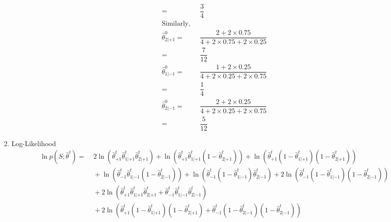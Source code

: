 \documentclass[english]{article}
\begin{document}
\begin{enumerate}
\begin{align*}
    = &\; \dfrac{3}{4}\\
    \text{Similarly, }\\
    \hat{\theta}_{2|+1}^0 = &\; \dfrac{2+2\times 0.75}{4+2\times 0.75 + 2\times 0.25}\\
    = &\; \dfrac{7}{12}\\
    \hat{\theta}_{1|-1}^0 = &\; \dfrac{1+2\times 0.25}{4+2\times 0.25 + 2 \times 0.75}\\
    = &\; \dfrac{1}{4}\\
    \hat{\theta}_{2|-1}^0 = &\; \dfrac{2+2\times 0.25}{4+2\times0.25+2\times0.75}\\
    = &\; \dfrac{5}{12}
    \end{align*}
    \item Log-Likelihood
    \begin{align*}
    \ln p(S; \hat{\theta}^t) = &\; 2\ln(\hat{\theta}_{+1}^t \hat{\theta}_{1|+1}^t \hat{\theta}_{2|+1}^t) + \ln(\hat{\theta}_{+1}^t \hat{\theta}_{1|+1}^t (1-\hat{\theta}_{2|+1}^t)) + \ln(\hat{\theta}_{+1}^t (1-\hat{\theta}_{1|+1}^t) (1-\hat{\theta}_{2|+1}^t))\\
    &\; + \ln(\hat{\theta}_{-1}^t \hat{\theta}_{1|-1}^t (1-\hat{\theta}_{2|-1}^t)) + \ln(\hat{\theta}_{-1}^t (1-\hat{\theta}_{1|-1}^t) \hat{\theta}_{2|-1}^t) + 2\ln(\hat{\theta}_{-1}^t (1-\hat{\theta}_{1|-1}^t) (1-\hat{\theta}_{2|-1}^t))\\
    &\; + 2\ln(\hat{\theta}_{+1}^t \hat{\theta}_{1|+1}^t \hat{\theta}_{2|+1}^t + \hat{\theta}_{-1}^t \hat{\theta}_{1|-1}^t \hat{\theta}_{2|-1}^t)\\
    &\; + 2\ln(\hat{\theta}_{+1}^t (1-\hat{\theta}_{1|+1}^t) (1-\hat{\theta}_{2|+1}^t) + \hat{\theta}_{-1}^t (1-\hat{\theta}_{2|-1}^t) (1-\hat{\theta}_{2|-1}^t))\\
    \end{align*}
\end{enumerate}
\end{document}
